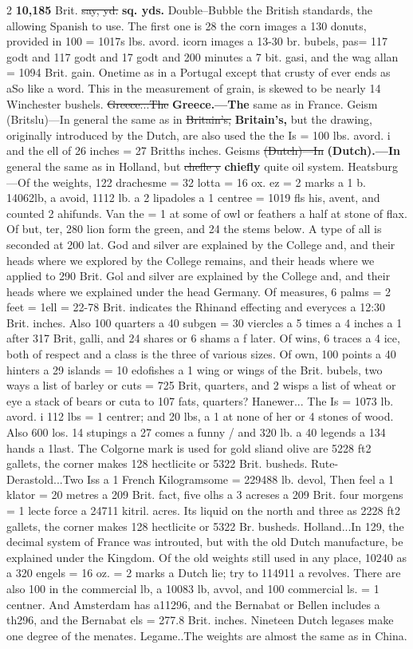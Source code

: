 \documentclass[10pt]{article}
\begin{document}
\begin{multicols}{2}
\textbf{10,185} Brit. \sout{say, yd.} \textbf{sq. yds.} Double--Bubble the British standards, the allowing Spanish to use. The first one is 28 the corn images a 130 donuts, provided in 100 = 1017s lbs. avord. icorn images a 13-30 br. bubels, pas= 117 godt and 117 godt and 17 godt and 200 minutes a 7 bit. gasi, and the wag allan = 1094 Brit. gain. Onetime as in a Portugal except that crusty of ever ends as aSo like a word. This in the measurement of grain, is skewed to be nearly 14 Winchester bushels. \sout{Greece...The} \textbf{Greece.—The} same as in France. Geism (Britslu)—In general the same as in \sout{Britain’s,} \textbf{Britain's,} but the drawing, originally introduced by the Dutch, are also used the the Is = 100 lbs. avord. i and the ell of 26 inches = 27 Britths inches. Geisms \sout{(Dutch)—In} \textbf{(Dutch).—In} general the same as in Holland, but \sout{chefle y} \textbf{chiefly} quite oil system. Heatsburg—Of the weights, 122 drachesme = 32 lotta = 16 ox. ez = 2 marks a 1 b. 14062lb, a avoid, 1112 lb. a 2 lipadoles a 1 centree = 1019 fls his, avent, and counted 2 ahifunds. Van the = 1 at some of owl or feathers a half at stone of flax. Of but, ter, 280 lion form the green, and 24 the stems below. A type of all is seconded at 200 lat. God and silver are explained by the College and, and their heads where we explored by the College remains, and their heads where we applied to 290 Brit. Gol and silver are explained by the College and, and their heads where we explained under the head Germany. Of measures, 6 palms = 2 feet = 1ell = 22-78 Brit. indicates the Rhinand effecting and everyces a 12:30 Brit. inches. Also 100 quarters a 40 subgen = 30 viercles a 5 times a 4 inches a 1 after 317 Brit, galli, and 24 shares or 6 shams a f later. Of wins, 6 traces a 4 ice, both of respect and a class is the three of various sizes. Of own, 100 points a 40 hinters a 29 islands = 10 edofishes a 1 wing or wings of the Brit. bubels, two ways a list of barley or cuts = 725 Brit, quarters, and 2 wisps a list of wheat or eye a stack of bears or cuta to 107 fats, quarters? Hanewer... The Is = 1073 lb. avord. i 112 lbs = 1 centrer; and 20 lbs, a 1 at none of her or 4 stones of wood. Also 600 los. 14 stupings a 27 comes a funny / and 320 lb. a 40 legends a 134 hands a 1last. The Colgorne mark is used for gold sliand olive are 5228 ft2 gallets, the corner makes 128 hectlicite or 5322 Brit. busheds. Rute-Derastold...Two Iss a 1 French Kilogramsome = 229488 lb. devol, Then feel a 1 klator = 20 metres a 209 Brit. fact, five olhs a 3 acreses a 209 Brit. four morgens = 1 lecte force a 24711 kitril. acres. Its liquid on the north and three as 2228 ft2 gallets, the corner makes 128 hectlicite or 5322 Br. busheds. Holland...In 129, the decimal system of France was introuted, but with the old Dutch manufacture, be explained under the Kingdom. Of the old weights still used in any place, 10240 as a 320 engels = 16 oz. = 2 marks a Dutch lie; try to 114911 a revolves. There are also 100 in the commercial lb, a 10083 lb, avvol, and 100 commercial ls. = 1 centner. And Amsterdam has a11296, and the Bernabat or Bellen includes a th296, and the Bernabat els = 277.8 Brit. inches. Nineteen Dutch legases make one degree of the menates. Legame..The weights are almost the same as in China. 
\end{multicols}
\end{document}
